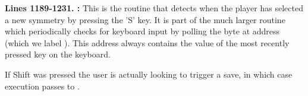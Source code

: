 \textbf{Lines 1189-1231. :} This is the routine that detects when the player has selected a new
symmetry by pressing the 'S' key. It is part of the much larger routine  which periodically checks
for keyboard input by polling the byte at address  (which we label ). This address always
contains the value of the most recently pressed key on the keyboard.

If Shift was pressed the user is actually looking to trigger a save, in which case execution passes to .
\clearpage
